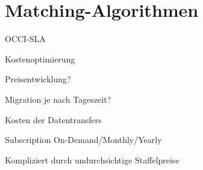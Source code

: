 


\section{Matching-Algorithmen}

OCCI-SLA


Kostenoptimierung

Preisentwicklung? 

Migration je nach Tageszeit? 

Kosten der Datentransfers 

Subscription On-Demand/Monthly/Yearly 

Kompliziert durch undurchsichtige Staffelpreise


%
%
%
%
%
%


%
%
%

